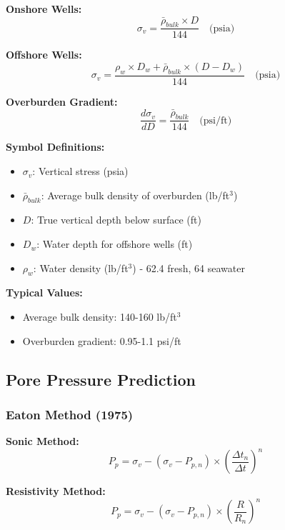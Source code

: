 \documentclass[11pt,a4paper]{article}
\newcommand{\symitem}[2]{\item \textbf{#1}: #2}
\begin{document}
\begin{tcolorbox}[colback=formulabox,colframe=black!75]
\textbf{Onshore Wells:}
\begin{equation}
\sigma_v = \frac{\bar{\rho}_{bulk} \times D}{144} \quad \text{(psia)}
\end{equation}

\textbf{Offshore Wells:}
\begin{equation}
\sigma_v = \frac{\rho_w \times D_w + \bar{\rho}_{bulk} \times (D - D_w)}{144} \quad \text{(psia)}
\end{equation}

\textbf{Overburden Gradient:}
\begin{equation}
\frac{d\sigma_v}{dD} = \frac{\bar{\rho}_{bulk}}{144} \quad \text{(psi/ft)}
\end{equation}
\end{tcolorbox}

\textbf{Symbol Definitions:}
\begin{itemize}[leftmargin=2cm]
\symitem{$\sigma_v$}{Vertical stress (psia)}
\symitem{$\bar{\rho}_{bulk}$}{Average bulk density of overburden (lb/ft$^3$)}
\symitem{$D$}{True vertical depth below surface (ft)}
\symitem{$D_w$}{Water depth for offshore wells (ft)}
\symitem{$\rho_w$}{Water density (lb/ft$^3$) - 62.4 fresh, 64 seawater}
\end{itemize}

\textbf{Typical Values:}
\begin{itemize}
\item Average bulk density: 140-160 lb/ft$^3$
\item Overburden gradient: 0.95-1.1 psi/ft
\end{itemize}

\subsection{Pore Pressure Prediction}

\subsubsection{Eaton Method (1975)}

\begin{tcolorbox}[colback=formulabox,colframe=black!75]
\textbf{Sonic Method:}
\begin{equation}
P_p = \sigma_v - (\sigma_v - P_{p,n}) \times \left(\frac{\Delta t_n}{\Delta t}\right)^{n}
\end{equation}

\textbf{Resistivity Method:}
\begin{equation}
P_p = \sigma_v - (\sigma_v - P_{p,n}) \times \left(\frac{R}{R_n}\right)^{n}
\end{equation}
\end{tcolorbox}
\end{document}
